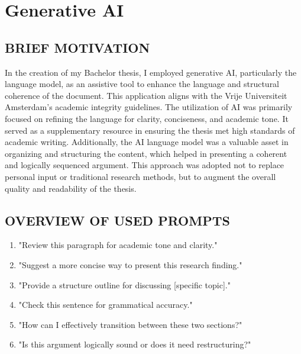 \section{Generative AI}\label{s:ai-disclosure}

\subsection{BRIEF MOTIVATION}
In the creation of my Bachelor thesis, I employed generative AI, particularly the  language model, as an assistive tool to enhance the language and structural coherence of the document. This application aligns with the Vrije Universiteit Amsterdam's academic integrity guidelines. The utilization of AI was primarily focused on refining the language for clarity, conciseness, and academic tone. It served as a supplementary resource in ensuring the thesis met high standards of academic writing. Additionally, the AI language model was a valuable asset in organizing and structuring the content, which helped in presenting a coherent and logically sequenced argument. This approach was adopted not to replace personal input or traditional research methods, but to augment the overall quality and readability of the thesis.


\subsection{OVERVIEW OF USED PROMPTS}
\begin{enumerate}
    \item "Review this paragraph for academic tone and clarity."
    \item "Suggest a more concise way to present this research finding."
    \item "Provide a structure outline for discussing [specific topic]."
    \item "Check this sentence for grammatical accuracy."
    \item "How can I effectively transition between these two sections?"
    \item "Is this argument logically sound or does it need restructuring?"
\end{enumerate}